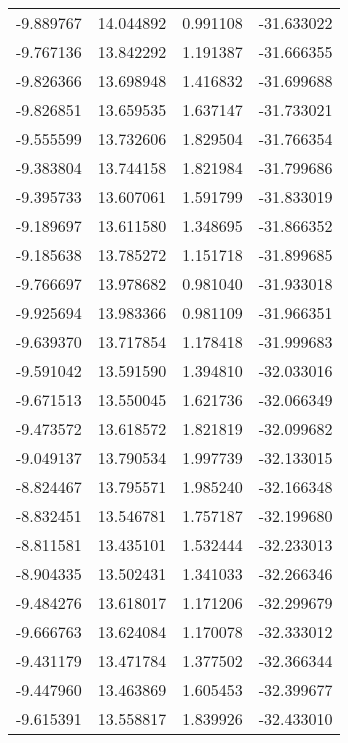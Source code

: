 \begin{tabular}{rrrr}
       -9.889767 &        14.044892 &    0.991108 & -31.633022 \\
       -9.767136 &        13.842292 &    1.191387 & -31.666355 \\
       -9.826366 &        13.698948 &    1.416832 & -31.699688 \\
       -9.826851 &        13.659535 &    1.637147 & -31.733021 \\
       -9.555599 &        13.732606 &    1.829504 & -31.766354 \\
       -9.383804 &        13.744158 &    1.821984 & -31.799686 \\
       -9.395733 &        13.607061 &    1.591799 & -31.833019 \\
       -9.189697 &        13.611580 &    1.348695 & -31.866352 \\
       -9.185638 &        13.785272 &    1.151718 & -31.899685 \\
       -9.766697 &        13.978682 &    0.981040 & -31.933018 \\
       -9.925694 &        13.983366 &    0.981109 & -31.966351 \\
       -9.639370 &        13.717854 &    1.178418 & -31.999683 \\
       -9.591042 &        13.591590 &    1.394810 & -32.033016 \\
       -9.671513 &        13.550045 &    1.621736 & -32.066349 \\
       -9.473572 &        13.618572 &    1.821819 & -32.099682 \\
       -9.049137 &        13.790534 &    1.997739 & -32.133015 \\
       -8.824467 &        13.795571 &    1.985240 & -32.166348 \\
       -8.832451 &        13.546781 &    1.757187 & -32.199680 \\
       -8.811581 &        13.435101 &    1.532444 & -32.233013 \\
       -8.904335 &        13.502431 &    1.341033 & -32.266346 \\
       -9.484276 &        13.618017 &    1.171206 & -32.299679 \\
       -9.666763 &        13.624084 &    1.170078 & -32.333012 \\
       -9.431179 &        13.471784 &    1.377502 & -32.366344 \\
       -9.447960 &        13.463869 &    1.605453 & -32.399677 \\
       -9.615391 &        13.558817 &    1.839926 & -32.433010 \\

\end{tabular}
